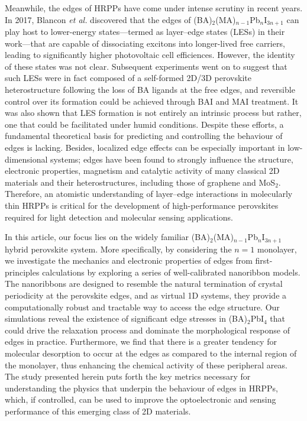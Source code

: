 \documentclass[aps,prl,preprint,11pt,superscriptaddress,bibnotes,amsmath,amssymb,amsfonts,showkeys]{revtex4-2}
\begin{document}
Meanwhile, the edges of HRPPs have come under intense scrutiny in recent years. In 2017, Blancon \textit{et al.} discovered that the edges of (BA)$_2$(MA)$_{n-1}$Pb$_n$I$_{3n+1}$ can play host to lower-energy states---termed as layer--edge states (LESs) in their work---that are capable of dissociating excitons into longer-lived free carriers, leading to significantly higher photovoltaic cell efficiences.\cite{BTles17} However, the identity of these states was not clear. Subsequent experiments went on to suggest that such LESs were in fact composed of a self-formed 2D/3D perovskite heterostructure following the loss of BA ligands at the free edges,\cite{QDhetedge20} and reversible control over its formation could be achieved through BAI and MAI treatment.\cite{ZTrevcon19} It was also shown that LES formation is not entirely an intrinsic process but rather, one that could be facilitated under humid conditions.\cite{SDhumid19} Despite these efforts, a fundamental theoretical basis for predicting and controlling the behaviour of edges is lacking. Besides, localized edge effects can be especially important in low-dimensional systems; edges have been found to strongly influence the structure, electronic properties, magnetism and catalytic activity of many classical 2D materials and their heterostructures, including those of graphene \cite{GYedgegrtmd17,HLedgegr09,SRedgegr08} and MoS$_2$.\cite{GYedgegrtmd17,SPedgetmd20,CSedgetmd15} Therefore, an atomistic understanding of layer--edge interactions in molecularly thin HRPPs is critical for the development of high-performance perovskites required for light detection \cite{FWplanar19,LAplanar18} and molecular sensing \cite{CLgasdet18} applications.

In this article, our focus lies on the widely familiar (BA)$_2$(MA)$_{n-1}$Pb$_n$I$_{3n+1}$ hybrid perovskite system. More specifically, by considering the $n = 1$ monolayer, we investigate the mechanics and electronic properties of edges from first-principles calculations by exploring a series of well-calibrated nanoribbon models. The nanoribbons are designed to resemble the natural termination of crystal periodicity at the perovskite edges, and as virtual 1D systems, they provide a computationally robust and tractable way to access the edge structure.\cite{ZFedgesim19} Our simulations reveal the existence of significant edge stresses in (BA)$_2$PbI$_4$ that could drive the relaxation process and dominate the morphological response of edges in practice. Furthermore, we find that there is a greater tendency for molecular desorption to occur at the edges as compared to the internal region of the monolayer, thus enhancing the chemical activity of these peripheral areas. The study presented herein puts forth the key metrics necessary for understanding the physics that underpin the behaviour of edges in HRPPs, which, if controlled, can be used to improve the optoelectronic and sensing performance of this emerging class of 2D materials.
\end{document}
